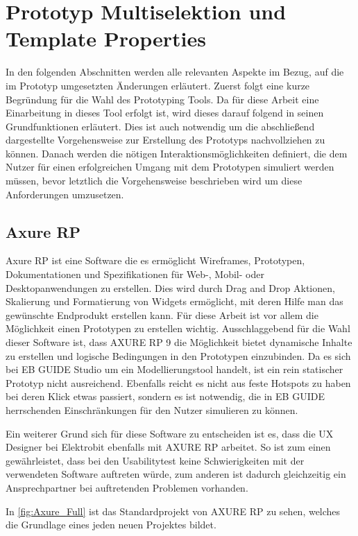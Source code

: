 \section {Prototyp Multiselektion und Template Properties}
In den folgenden Abschnitten werden alle relevanten Aspekte im Bezug, auf die im Prototyp umgesetzten Änderungen erläutert.
Zuerst folgt eine kurze Begründung für die Wahl des Prototyping Tools.
Da für diese Arbeit eine Einarbeitung in dieses Tool erfolgt ist, wird dieses darauf folgend in seinen Grundfunktionen erläutert.
Dies ist auch notwendig um die abschließend dargestellte Vorgehensweise zur Erstellung des Prototyps nachvollziehen zu können.
Danach werden die nötigen Interaktionsmöglichkeiten definiert, die dem Nutzer für einen erfolgreichen Umgang mit dem Prototypen simuliert werden müssen, bevor letztlich die Vorgehensweise beschrieben wird um diese Anforderungen umzusetzen.

\subsection {Axure RP}
Axure RP ist eine Software die es ermöglicht Wireframes, Prototypen, Dokumentationen und Spezifikationen für Web-, Mobil- oder Desktopanwendungen zu erstellen.
Dies wird durch Drag and Drop Aktionen, Skalierung und Formatierung von Widgets ermöglicht, mit deren Hilfe man das gewünschte Endprodukt erstellen kann.
Für diese Arbeit ist vor allem die Möglichkeit einen Prototypen zu erstellen wichtig.
Ausschlaggebend für die Wahl dieser Software ist, dass AXURE RP 9 die Möglichkeit bietet dynamische Inhalte zu erstellen und logische Bedingungen in den Prototypen einzubinden.
Da es sich bei EB GUIDE Studio um ein Modellierungstool handelt, ist ein rein statischer Prototyp nicht ausreichend.
Ebenfalls reicht es nicht aus feste Hotspots zu haben bei deren Klick etwas passiert, sondern es ist notwendig, die in EB GUIDE herrschenden Einschränkungen für den Nutzer simulieren zu können.

Ein weiterer Grund sich für diese Software zu entscheiden ist es, dass die UX Designer bei Elektrobit ebenfalls mit AXURE RP arbeitet.
So ist zum einen gewährleistet, dass bei den Usabilitytest keine Schwierigkeiten mit der verwendeten Software auftreten würde, zum anderen ist dadurch gleichzeitig ein Ansprechpartner bei auftretenden Problemen vorhanden.

In \cref{fig:Axure_Full} ist das Standardprojekt von AXURE RP zu sehen, welches die Grundlage eines jeden neuen Projektes bildet.

